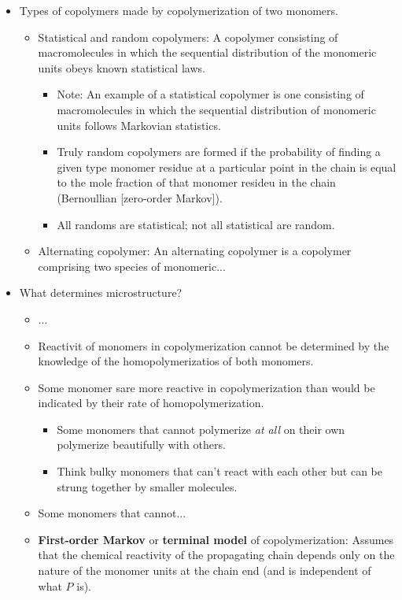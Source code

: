 \documentclass[../notes.tex]{subfiles}
\begin{document}
\begin{itemize}
\begin{itemize}
    \end{itemize}
    \item Types of copolymers made by copolymerization of two monomers.
    \begin{itemize}
        \item Statistical and random copolymers: A copolymer consisting of macromolecules in which the sequential distribution of the monomeric units obeys known statistical laws.
        \begin{itemize}
            \item Note: An example of a statistical copolymer is one consisting of macromolecules in which the sequential distribution of monomeric units follows Markovian statistics.
            \item Truly random copolymers are formed if the probability of finding a given type monomer residue at a particular point in the chain is equal to the mole fraction of that monomer resideu in the chain (Bernoullian [zero-order Markov]).
            \item All randoms are statistical; not all statistical are random.
        \end{itemize}
        \item Alternating copolymer: An alternating copolymer is a copolymer comprising two species of monomeric...
    \end{itemize}
    \item What determines microstructure?
    \begin{itemize}
        \item ...
        \item Reactivit of monomers in copolymerization cannot be determined by the knowledge of the homopolymerizatios of both monomers.
        \item Some monomer sare more reactive in copolymerization than would be indicated by their rate of homopolymerization.
        \begin{itemize}
            \item Some monomers that cannot polymerize \emph{at all} on their own polymerize beautifully with others.
            \item Think bulky monomers that can't react with each other but can be strung together by smaller molecules.
        \end{itemize}
        \item Some monomers that cannot...
        \item \textbf{First-order Markov} or \textbf{terminal model} of copolymerization: Assumes that the chemical reactivity of the propagating chain depends only on the nature of the monomer units at the chain end (and is independent of what $P$ is).

\end{itemize}
\end{itemize}
\end{document}
